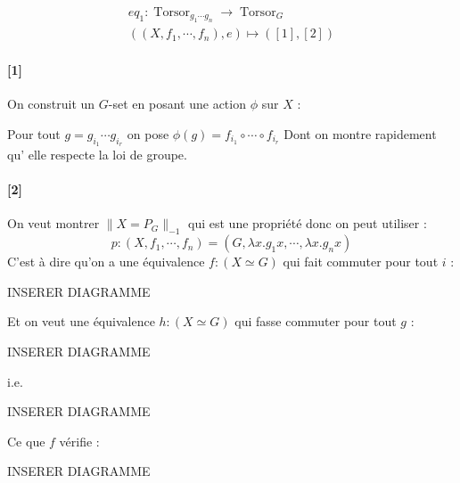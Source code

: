 \documentclass{article}
\DeclareMathOperator{\torsor}{Torsor}
\begin{document}
\begin{gather*}
  eq_{1} : \torsor_{g_1 \cdots g_{n}} \to \torsor_{G}\\
        ((X,f_1, \cdots, f_{n}), e) \mapsto ([1],[2])
\end{gather*}

\paragraph{[1]} On construit un $G$-set en posant une action $\phi$ sur $X$ :

Pour tout $g = g_{i_{1}} \cdots g_{i_{r}}$ on pose $\phi(g) = f_{i_{1}} \circ \cdots \circ f_{i_{r}}$
Dont on montre rapidement qu' elle respecte la loi de groupe.

\paragraph{[2]} On veut montrer $\|X = P_{G}\|_{-1}$ qui est une propriété donc on peut utiliser :
\[p : (X,f_1,\cdots,f_{n}) = (G,\lambda x.g_1x,\cdots,\lambda x.g_{n}x)\]
C'est à dire qu'on a une équivalence $f : (X \simeq G)$ qui fait commuter pour tout $i$ :

INSERER DIAGRAMME

Et on veut une équivalence $h : (X \simeq G)$ qui fasse commuter pour tout $g$ :

INSERER DIAGRAMME

i.e.

INSERER DIAGRAMME

Ce que $f$ vérifie :

INSERER DIAGRAMME
\end{document}

